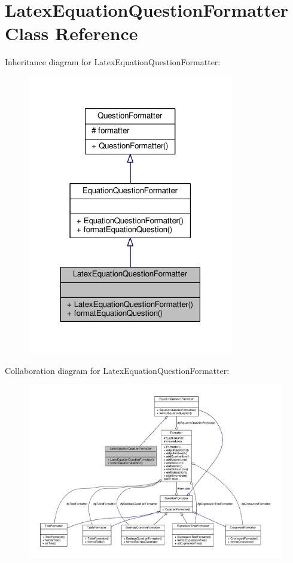\hypertarget{classLatexEquationQuestionFormatter}{}\section{Latex\+Equation\+Question\+Formatter Class Reference}
\label{classLatexEquationQuestionFormatter}


Inheritance diagram for Latex\+Equation\+Question\+Formatter\+:
\nopagebreak
\begin{figure}[H]
\begin{center}
\leavevmode
\includegraphics[width=255pt]{classLatexEquationQuestionFormatter__inherit__graph}
\end{center}
\end{figure}


Collaboration diagram for Latex\+Equation\+Question\+Formatter\+:
\nopagebreak
\begin{figure}[H]
\begin{center}
\leavevmode
\includegraphics[width=350pt]{classLatexEquationQuestionFormatter__coll__graph}
\end{center}
\end{figure}
